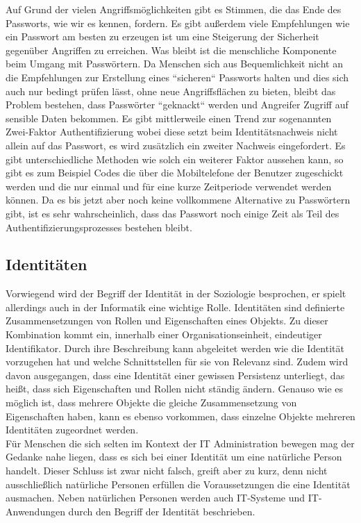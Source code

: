 \documentclass[
book,
a4paper,   
titlepage,  
halfparskip,
12pt        
]{scrartcl}
\begin{document}
\begin{onehalfspacing}
Auf Grund der vielen Angriffsmöglichkeiten gibt es Stimmen, die das Ende des Passworts, wie wir es kennen, fordern\cite{passw}. Es gibt außerdem viele Empfehlungen wie ein Passwort am besten zu erzeugen ist um eine Steigerung der Sicherheit gegenüber Angriffen zu erreichen\cite[S. 11]{passwo}. Was bleibt ist die menschliche Komponente beim Umgang mit Passwörtern. Da Menschen sich aus Bequemlichkeit nicht an die Empfehlungen zur Erstellung eines ``sicheren`` Passworts halten und dies sich auch nur bedingt prüfen lässt, ohne neue Angriffsflächen zu bieten, bleibt das Problem bestehen, dass Passwörter ``geknackt`` werden und Angreifer Zugriff auf sensible Daten bekommen. Es gibt mittlerweile einen Trend zur sogenannten Zwei-Faktor Authentifizierung \cite{passw} wobei diese setzt beim Identitätsnachweis nicht allein auf das Passwort, es wird zusätzlich ein zweiter Nachweis eingefordert. Es gibt unterschiedliche Methoden wie solch ein weiterer Faktor aussehen kann, so gibt es zum Beispiel Codes die über die Mobiltelefone der Benutzer zugeschickt werden und die nur einmal und für eine kurze Zeitperiode verwendet werden können. Da es bis jetzt aber noch keine vollkommene Alternative zu Passwörtern gibt, ist es sehr wahrscheinlich, dass das Passwort noch einige Zeit als Teil des Authentifizierungsprozesses bestehen bleibt.\cite{pass}

\subsection{Identitäten}
\label{subsec:ident}
Vorwiegend wird der Begriff der Identität in der Soziologie besprochen\cite[S. 21]{kerberos2}, er spielt allerdings auch in der Informatik eine wichtige Rolle. Identitäten sind definierte Zusammensetzungen von Rollen und Eigenschaften eines Objekts. Zu dieser Kombination kommt ein, innerhalb einer Organisationseinheit, eindeutiger Identifikator. Durch ihre Beschreibung kann abgeleitet werden wie die Identität vorzugehen hat und welche Schnittstellen für sie von Relevanz sind. Zudem wird davon ausgegangen, dass eine Identität einer gewissen Persistenz unterliegt, das heißt, dass sich Eigenschaften und Rollen nicht ständig ändern. Genauso wie es möglich ist, dass mehrere Objekte die gleiche Zusammensetzung von Eigenschaften haben, kann es ebenso vorkommen, dass einzelne Objekte mehreren Identitäten zugeordnet werden.\\
Für Menschen die sich selten im Kontext der \ac{IT} Administration bewegen mag der Gedanke nahe liegen, dass es sich bei einer Identität um eine natürliche Person handelt. Dieser Schluss ist zwar nicht falsch, greift aber zu kurz, denn nicht ausschließlich natürliche Personen erfüllen die Voraussetzungen die eine Identität ausmachen. Neben natürlichen Personen werden auch \ac{IT}-Systeme und \ac{IT}-Anwendungen durch den Begriff der Identität beschrieben. \cite[S. 21ff]{kerberos2}


\end{onehalfspacing}
\end{document}
